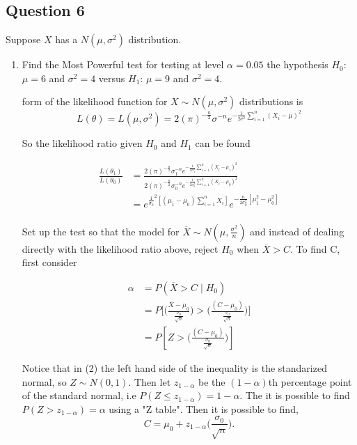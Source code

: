 \documentclass{tufte-book}
\theoremstyle{mytheoremstyle}
\theoremstyle{mylemstyle}
\theoremstyle{mydefstyle}
\begin{document}
\subsection{Question 6}
Suppose $X$ has a $N(\mu, \sigma^2)$ distribution.
\begin{enumerate}
\item Find the Most Powerful test for testing at level $\alpha=0.05$ the hypothesis $H_0$:$\mu = 6$ and $\sigma^2=4$ versus $H_1$: $\mu=9$ and $\sigma^2=4$.

 form of the likelihood function for $X \sim N(\mu, \sigma^2)$ distributions is
\[ L(\theta) = L(\mu, \sigma^2) = 2(\pi)^{-\frac{n}{2}} \sigma^{-n} e^{-\frac{1}{2\sigma^2}\sum_{i=1}^n(X_i-\mu)^2} \]

So the likelihood ratio given $H_0$ and $H_1$ can be found 

\begin{align*}
\frac{ L(\theta_1)}{L(\theta_0)} &= \frac{2(\pi)^{-\frac{n}{2}} \sigma_1^{-n} e^{-\frac{1}{2\sigma_1^2}\sum_{i=1}^n(X_i-\mu_1)^2}}{2(\pi)^{-\frac{n}{2}} \sigma_0^{-n} e^{-\frac{1}{2\sigma_0^2}\sum_{i=1}^n(X_i-\mu_0)^2}}\\
&=e^{\frac{1}{\sigma_0}^2 [(\mu_1-\mu_0)\sum_{i=1}^nX_i]} e^{-\frac{n}{2\sigma_0^2}[\mu_1^2 -\mu_0^2]}\\
\end{align*}

Set up the test so that the model for $\overline{X} \sim N(\mu, \frac{\sigma^2}{n})$ and instead of dealing directly with the likelihood ratio above, reject $H_0$ when $\overline{X} > C$.  To find C, first consider

\begin{align}
\alpha &= P(\overline{X} > C \mid H_0)\\
&=P\Big[\Big(\frac{\overline{X} - \mu_0}{\frac{\sigma_0}{\sqrt{n}}}\Big) > \Big(\frac{(C- \mu_0)}{\frac{\sigma_0}{\sqrt{n}}}\Big) \Big]\\
&= P[Z > \Big(\frac{(C- \mu_0)}{\frac{\sigma_0}{\sqrt{n}}}\Big) ]
\end{align}

Notice that in (2) the left hand side of the inequality is the standarized normal, so $Z \sim N(0,1)$.  Then let $z_{1-\alpha}$ be the $(1-\alpha)$th percentage point of the standard normal, i.e $P(Z \leq z_{1-\alpha}) = 1-\alpha$.  The it is possible to find $P(Z>z_{1-\alpha}) = \alpha$ using a "Z table".  Then it is possible to find,
\[C = \mu_0 + z_{1-\alpha}\Big(\frac{\sigma_0}{\sqrt{n}}\Big).\]


\end{enumerate}
\end{document}
